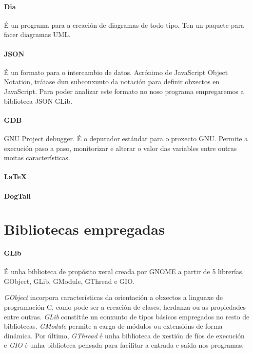 \paragraph{Dia} É un programa para a creación de diagramas de todo tipo. Ten un paquete para facer diagramas UML.

\paragraph{JSON} É un formato para o intercambio de datos. Acrónimo de JavaScript Object Notation, trátase dun subconxunto da notación para definir obxectos en JavaScript. Para poder analizar este formato no noso programa empregaremos a biblioteca JSON-GLib.

\paragraph{GDB} GNU Project debugger. É o depurador estándar para o proxecto GNU. Permite a execución paso a paso, monitorizar e alterar o valor das variables entre outras moitas características.

\paragraph{\LaTeX}

\paragraph{DogTail}


\section{Bibliotecas empregadas}

\paragraph{GLib} É unha biblioteca de propósito xeral creada por GNOME a partir de 5 librerías, GObject, GLib, GModule, GThread e GIO.

\emph{GObject} incorpora características da orientación a obxectos a linguaxe de programación C, como pode ser a creación de clases, herdanza ou as propiedades entre outras. \emph{GLib} constitúe un conxunto de tipos básicos empregados no resto de bibliotecas. \emph{GModule} permite a carga de módulos ou extensións de forma dinámica. Por último, \emph{GThread} é unha biblioteca de xestión de fíos de execución e \emph{GIO} é unha biblioteca pensada para facilitar a entrada e saída nos programas.

